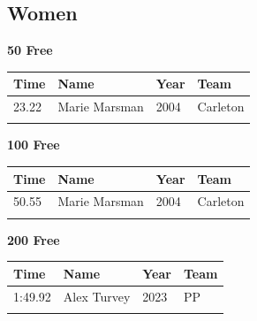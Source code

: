 
\clearpage
{}

\clearpage
\subsection{Women}
\vspace{1.2em}
\noindent\begin{minipage}[t]{0.98\textwidth}
\centering
\textbf{\textcolor{teamprimary}{50 Free}}\par
\vspace{0.5em}
\centering
\small
\renewcommand{\arraystretch}{1.0}
\setlength{\tabcolsep}{4pt}
\begin{tabular}{@{}p{2.5cm}p{4.5cm}p{1.5cm}p{2.5cm}@{}}
\toprule
\textbf{Time} & \textbf{Name} & \textbf{Year} & \textbf{Team} \\
\midrule
23.22 & Marie Marsman & 2004 & Carleton \\
\bottomrule
\vspace{0.5em}
\end{tabular}
\end{minipage}
\vspace{1.2em}
\noindent\begin{minipage}[t]{0.98\textwidth}
\centering
\textbf{\textcolor{teamprimary}{100 Free}}\par
\vspace{0.5em}
\centering
\small
\renewcommand{\arraystretch}{1.0}
\setlength{\tabcolsep}{4pt}
\begin{tabular}{@{}p{2.5cm}p{4.5cm}p{1.5cm}p{2.5cm}@{}}
\toprule
\textbf{Time} & \textbf{Name} & \textbf{Year} & \textbf{Team} \\
\midrule
50.55 & Marie Marsman & 2004 & Carleton \\
\bottomrule
\vspace{0.5em}
\end{tabular}
\end{minipage}
\vspace{1.2em}
\noindent\begin{minipage}[t]{0.98\textwidth}
\centering
\textbf{\textcolor{teamprimary}{200 Free}}\par
\vspace{0.5em}
\centering
\small
\renewcommand{\arraystretch}{1.0}
\setlength{\tabcolsep}{4pt}
\begin{tabular}{@{}p{2.5cm}p{4.5cm}p{1.5cm}p{2.5cm}@{}}
\toprule
\textbf{Time} & \textbf{Name} & \textbf{Year} & \textbf{Team} \\
\midrule
1:49.92 & Alex Turvey & 2023 & PP \\
\bottomrule
\vspace{0.5em}
\end{tabular}
\end{minipage}
